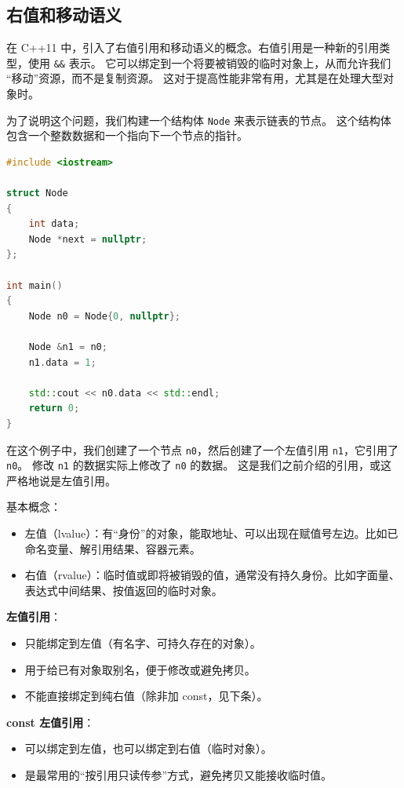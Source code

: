 \documentclass[a4paper]{ctexart}
\theoremstyle{definition}
\theoremstyle{definition}
\begin{document}
\subsection{右值和移动语义}

在 C++11 中，引入了右值引用和移动语义的概念。右值引用是一种新的引用类型，使用 \verb|&&| 表示。 它可以绑定到一个将要被销毁的临时对象上，从而允许我们
“移动”资源，而不是复制资源。 这对于提高性能非常有用，尤其是在处理大型对象时。

为了说明这个问题，我们构建一个结构体 \verb|Node| 来表示链表的节点。 这个结构体包含一个整数数据和一个指向下一个节点的指针。
\begin{lstlisting}[language=c++]
#include <iostream>

struct Node
{
    int data;
    Node *next = nullptr;
};

int main()
{
    Node n0 = Node{0, nullptr};

    Node &n1 = n0;
    n1.data = 1;

    std::cout << n0.data << std::endl;
    return 0;
}
\end{lstlisting}
在这个例子中，我们创建了一个节点 \verb|n0|，然后创建了一个左值引用 \verb|n1|，它引用了 \verb|n0|。 修改 \verb|n1| 的数据实际上修改了 \verb|n0| 的数据。
这是我们之前介绍的引用，或这严格地说是左值引用。

基本概念：
\begin{itemize}
  \item 左值（lvalue）：有“身份”的对象，能取地址、可以出现在赋值号左边。比如已命名变量、解引用结果、容器元素。
  \item 右值（rvalue）：临时值或即将被销毁的值，通常没有持久身份。比如字面量、表达式中间结果、按值返回的临时对象。
\end{itemize}


\textbf{左值引用}：
\begin{itemize}
  \item 只能绑定到左值（有名字、可持久存在的对象）。
  \item 用于给已有对象取别名，便于修改或避免拷贝。
  \item 不能直接绑定到纯右值（除非加 const，见下条）。
\end{itemize}

\textbf{const 左值引用}：
\begin{itemize}
  \item 可以绑定到左值，也可以绑定到右值（临时对象）。
  \item 是最常用的“按引用只读传参”方式，避免拷贝又能接收临时值。
\end{itemize}
\end{document}
